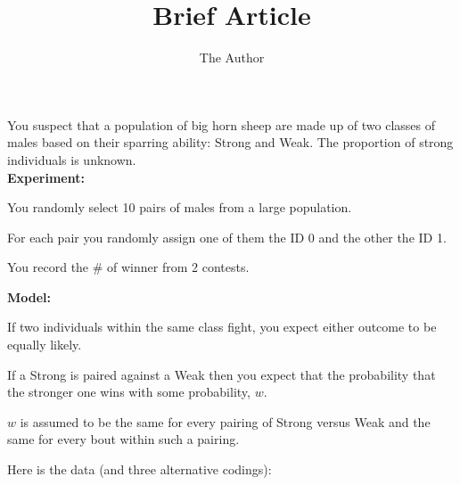 \documentclass[11pt]{article}
\title{Brief Article}
\author{The Author}
\begin{document}
You suspect that a population of big horn sheep are made up of two classes of males based on their sparring ability: Strong and Weak. The proportion of strong individuals is unknown.\\ {\bf Experiment:}
\begin{compactitem}
	\item You randomly select 10 pairs of males from a large population. 
	\item For each pair you randomly assign one of them the ID 0 and the other the ID 1.  
	\item You record the \# of winner from 2 contests.
\end{compactitem}
{\bf Model:}
\begin{compactitem}
	\item If two individuals within the same class fight, you expect either outcome to be equally likely.
	\item If a Strong is paired against a Weak then you expect that the probability that the stronger one wins with some probability, $w$.
	\item $w$ is assumed to be the same for every pairing of Strong {versus} Weak and the same for every bout within such a pairing.
\end{compactitem}
Here is the data (and three alternative codings):\\
\end{document}
